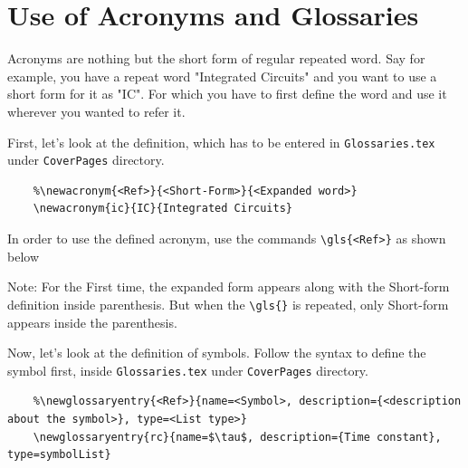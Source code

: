 \section{Use of Acronyms and Glossaries}
Acronyms are nothing but the short form of regular repeated word. Say for example, you have a repeat word "Integrated Circuits" and you want to use a short form for it as "IC". For which you have to first define the word and use it wherever you wanted to refer it.

First, let's look at the definition, which has to be entered in \texttt{Glossaries.tex} under \texttt{CoverPages} directory.
\begin{verbatim}
	%\newacronym{<Ref>}{<Short-Form>}{<Expanded word>}
	\newacronym{ic}{IC}{Integrated Circuits}
\end{verbatim}
In order to use the defined acronym, use the commands \verb|\gls{<Ref>}| as shown below


Note: For the First time, the expanded form appears along with the Short-form definition inside parenthesis. But when the \verb|\gls{}| is repeated, only Short-form appears inside the parenthesis.

Now, let's look at the definition of symbols. Follow the syntax to define the symbol first, inside \texttt{Glossaries.tex} under \texttt{CoverPages} directory.
\begin{verbatim}
	%\newglossaryentry{<Ref>}{name=<Symbol>, description={<description about the symbol>}, type=<List type>}
	\newglossaryentry{rc}{name=$\tau$, description={Time constant}, type=symbolList}
\end{verbatim}

